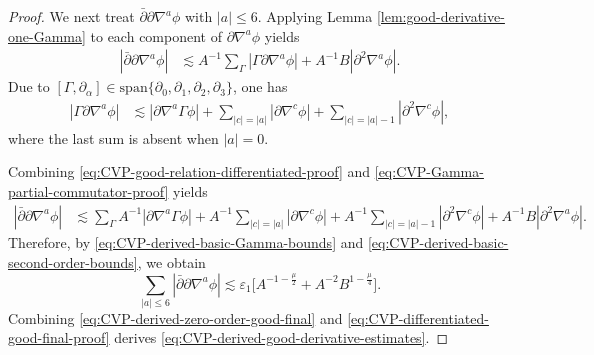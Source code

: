 \documentclass[11pt,twoside]{article}
\def\f{\frac}
\def\p{\partial}
\def\ve{\varepsilon}
\def\ls{\lesssim}
\theoremstyle{plain}
\theoremstyle{definition}
\theoremstyle{assumption}
\numberwithin{equation}{section}
\begin{document}
\begin{proof}
		We next treat
		\(\bar{\p}\p\nabla^a\phi\) with
		\(|a|\le 6\). Applying Lemma  \ref{lem:good-derivative-one-Gamma} to
		each component of \(\p\nabla^a\phi\) yields
		\begin{equation}
			\label{eq:CVP-good-relation-differentiated-proof}
			\begin{aligned}
				|\bar{\p}\p\nabla^a\phi|
				&\ls
				A^{-1}\sum_{\Gamma}
				|\Gamma\p\nabla^a\phi|
				+
				A^{-1}B|\p^2\nabla^a\phi|.
			\end{aligned}
		\end{equation}
		Due to $[\Gamma,\p_\alpha]\in \mathrm{span}\{\p_0,\p_1,\p_2,\p_3\}$, one has
		\begin{equation}
			\label{eq:CVP-Gamma-partial-commutator-proof}
			\begin{aligned}
				|\Gamma\p\nabla^a\phi|
				&\ls
				|\p\nabla^a\Gamma\phi|
				+
				\sum_{|c|= |a|}
				|\p\nabla^c\phi|
				+
				\sum_{|c|= |a|-1}
				|\p^2\nabla^c\phi|,
			\end{aligned}
		\end{equation}
		where the last sum is absent when \(|a|=0\).

		Combining
		\eqref{eq:CVP-good-relation-differentiated-proof} and
		\eqref{eq:CVP-Gamma-partial-commutator-proof} yields
		\begin{equation}
			\label{eq:CVP-good-relation-differentiated-weighted-proof}
			\begin{aligned}
				|\bar{\p}\p\nabla^a\phi|
				&\ls
				\sum_{\Gamma}
				A^{-1}
				|\p\nabla^a\Gamma\phi|
				+
				A^{-1}
				\sum_{|c| = |a|}
				|\p\nabla^c\phi|
				+
				A^{-1}
				\sum_{|c| = |a|-1}
				|\p^2\nabla^c\phi|
				+
				A^{-1}B
				|\p^2\nabla^a\phi|.
			\end{aligned}
		\end{equation}
		Therefore, by  \eqref{eq:CVP-derived-basic-Gamma-bounds} and
		\eqref{eq:CVP-derived-basic-second-order-bounds}, we obtain
		\begin{equation}
			\label{eq:CVP-differentiated-good-final-proof}
			\sum_{|a|\le 6}
			|\bar{\p}\p\nabla^a\phi|
			\ls
			\ve_1\big[A^{-1-\f\mu2}
			+A^{-2}	B^{1-\f\mu4}\big].
		\end{equation}
		Combining
		\eqref{eq:CVP-derived-zero-order-good-final} and
		\eqref{eq:CVP-differentiated-good-final-proof} derives
		\eqref{eq:CVP-derived-good-derivative-estimates}.
		

\end{proof}
\end{document}
